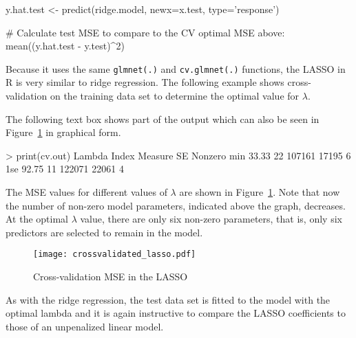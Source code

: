 \begin{samepage}
\begin{Rcode}
y.hat.test <- predict(ridge.model, newx=x.test, 
                                      type='response')

# Calculate test MSE to compare to the CV optimal MSE above:
mean((y.hat.test - y.test)^2)
\end{Rcode}
\end{samepage}

Because it uses the same \texttt{glmnet(.)} and \texttt{cv.glmnet(.)} functions, the LASSO in R is very similar to ridge regression. The following example shows cross-validation on the training data set to determine the optimal value for $\lambda$. 

\begin{samepage}
\end{samepage}

The following text box shows part of the output which can also be seen in Figure~\ref{fig:lassocv} in graphical form. 

\begin{textcode}
> print(cv.out)
    Lambda Index Measure    SE Nonzero
min  33.33    22  107161 17195       6
1se  92.75    11  122071 22061       4
\end{textcode}

The MSE values for different values of $\lambda$ are shown in Figure~\ref{fig:lassocv}. Note that now the number of non-zero model parameters, indicated above the graph, decreases. At the optimal $\lambda$ value, there are only six non-zero parameters, that is, only six predictors are selected to remain in the model.

\begin{figure}
\centering
\texttt{[image: crossvalidated\_lasso.pdf]}

\caption{Cross-validation MSE in the LASSO}
\label{fig:lassocv}
\end{figure}

As with the ridge regression, the test data set is fitted to the model with the optimal lambda and it is again instructive to compare the LASSO coefficients to those of an unpenalized linear model.

